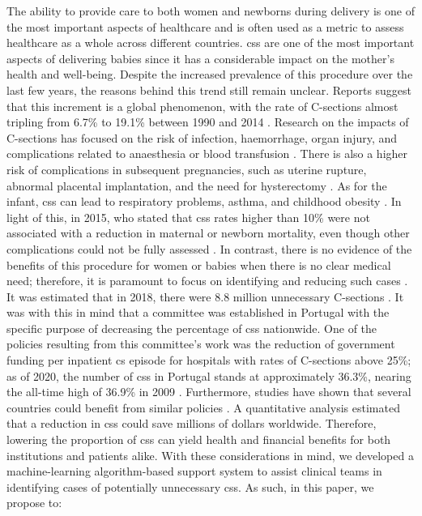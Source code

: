 
The ability to provide care to both women and newborns during delivery is one of the most important aspects of healthcare and is often used as a metric to assess healthcare as a whole across different countries. \acp{cs} are one of the most important aspects of delivering babies since it has a considerable impact on the mother's health and well-being. Despite the increased prevalence of this procedure over the last few years, the reasons behind this trend still remain unclear. Reports suggest that this increment is a global phenomenon, with the rate of C-sections almost tripling from 6.7\% to 19.1\% between 1990 and 2014 \cite{betranIncreasingTrendCaesarean2016,chenNonClinicalInterventions2018}. Research on the impacts of C-sections has focused on the risk of infection, haemorrhage, organ injury, and complications related to anaesthesia or blood transfusion \cite{caesereanrisk1,caesereanrisk2}.
There is also a higher risk of complications in subsequent pregnancies, such as uterine rupture, abnormal placental implantation, and the need for hysterectomy \cite{caesereanrisk3,caesereanrisk4}. As for the infant, \acp{cs} can lead to respiratory problems, asthma, and childhood obesity \cite{caesereanrisk3}.
In light of this, in 2015, \ac{who} stated that \acp{cs} rates higher than 10\% were not associated with a reduction in maternal or newborn mortality, even though other complications could not be fully assessed \cite{worldhealthorganizationhumanreproductionprogramme10april2015WHOStatementCaesarean2015}. In contrast, there is no evidence of the benefits of this procedure for women or babies when there is no clear medical need; therefore, it is paramount to focus on identifying and reducing such cases \cite{chenNonClinicalInterventions2018}.  It was estimated that in 2018, there were 8.8 million unnecessary C-sections \cite{hoxhaCaesareanSectionsHealth2021}.
It was with this in mind that a committee was established in Portugal with the specific purpose of decreasing the percentage of \acp{cs} nationwide. One of the policies resulting from this committee's work was the reduction of government funding per inpatient \ac{cs} episode for hospitals with rates of C-sections above 25\%; as of 2020, the number of \acp{cs} in Portugal stands at approximately 36.3\%, nearing the all-time high of 36.9\% in 2009 \cite{pordatacesarianas}. Furthermore, studies have shown that several countries could benefit from similar policies \cite{hoxhaCaesareanSectionsHealth2021}.
A quantitative analysis estimated that a reduction in \acp{cs} could save millions of dollars \cite{callanderFinancingMaternityEarly2020} worldwide. Therefore, lowering the proportion of \acp{cs} can yield health and financial benefits for both institutions and patients alike. With these considerations in mind, we developed a machine-learning algorithm-based support system to assist clinical teams in identifying cases of potentially unnecessary \acp{cs}. As such, in this paper, we propose to:


